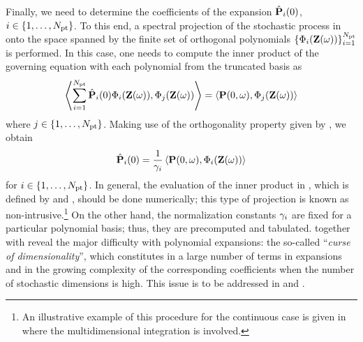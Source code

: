Finally, we need to determine the coefficients of the expansion $\hat{\mathbf{P}}_i(0)$, $i \in \{ 1, \dotsc, {N_\text{pt}} \}$. To this end, a spectral projection of the stochastic process in  onto the space spanned by the finite set of orthogonal polynomials $\{ \Phi_i(\mathbf{Z}(\omega)) \}_{i = 1}^{{N_\text{pt}}}$ is performed. In this case, one needs to compute the inner product of the governing equation  with each polynomial from the truncated basis as
\[
  \oInner{\sum_{i=1}^{\pcterms} \pcc{\vP}_i(0) \pcb_i(\vZ(\o))}{\pcb_j(\vZ(\o))} = \oInner{\vP(0, \o)}{\pcb_j(\vZ(\o))}
\]
where $j \in \{ 1, \dotsc, {N_\text{pt}} \}$. Making use of the orthogonality property given by , we obtain
\begin{equation} \elabel{pc-coefficients}
  \pcc{\vP}_i(0) = \frac{1}{\pcn_i} \oInner{\vP(0, \o)}{\pcb_i(\vZ(\o))}
\end{equation}
for $i \in \{ 1, \dotsc, {N_\text{pt}} \}$. In general, the evaluation of the inner product in , which is defined by  and , should be done numerically; this type of projection is known as non-intrusive.\footnote{An illustrative example of this procedure for the continuous case is given in  where the multidimensional integration is involved.} On the other hand, the normalization constants $\gamma_i$ are fixed for a particular polynomial basis; thus, they are precomputed and tabulated.  together with  reveal the major difficulty with polynomial expansions: the so-called ``\emph{curse of dimensionality}'', which constitutes in a large number of terms in expansions and in the growing complexity of the corresponding coefficients when the number of stochastic dimensions is high. This issue is to be addressed in  and .

